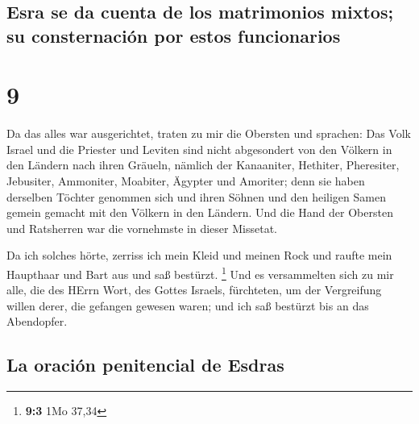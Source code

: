 \hypertarget{esra-se-da-cuenta-de-los-matrimonios-mixtos-su-consternaciuxf3n-por-estos-funcionarios}{%
\subsection{Esra se da cuenta de los matrimonios mixtos; su
consternación por estos
funcionarios}\label{esra-se-da-cuenta-de-los-matrimonios-mixtos-su-consternaciuxf3n-por-estos-funcionarios}}

\hypertarget{section-8}{%
\section{9}\label{section-8}}

 Da das alles war ausgerichtet, traten zu mir die Obersten
und sprachen: Das Volk Israel und die Priester und Leviten sind nicht
abgesondert von den Völkern in den Ländern nach ihren Gräueln, nämlich
der Kanaaniter, Hethiter, Pheresiter, Jebusiter, Ammoniter, Moabiter,
Ägypter und Amoriter;  denn sie haben derselben Töchter
genommen sich und ihren Söhnen und den heiligen Samen gemein gemacht mit
den Völkern in den Ländern. Und die Hand der Obersten und Ratsherren war
die vornehmste in dieser Missetat.

 Da ich solches hörte, zerriss ich mein Kleid und meinen
Rock und raufte mein Haupthaar und Bart aus und saß bestürzt.
\footnote{\textbf{9:3} 1Mo 37,34}  Und es versammelten
sich zu mir alle, die des HErrn Wort, des Gottes Israels, fürchteten, um
der Vergreifung willen derer, die gefangen gewesen waren; und ich saß
bestürzt bis an das Abendopfer.

\hypertarget{la-oraciuxf3n-penitencial-de-esdras}{%
\subsection{La oración penitencial de
Esdras}\label{la-oraciuxf3n-penitencial-de-esdras}}

